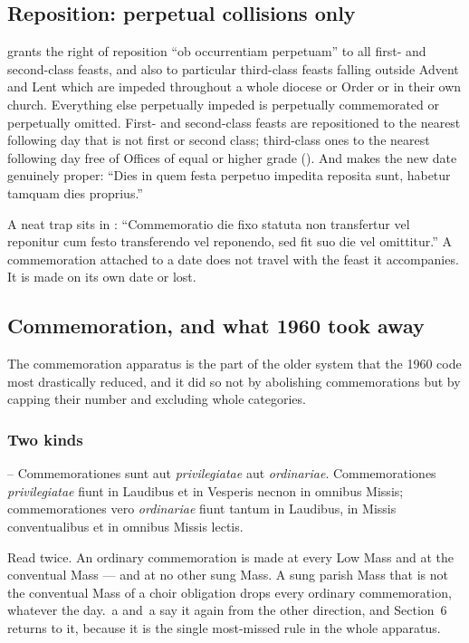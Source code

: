\subsection{Reposition: perpetual collisions only}

 grants the right of reposition ``ob occurrentiam perpetuam'' to all
first- and second-class feasts, and also to particular third-class feasts
falling outside Advent and Lent which are impeded throughout a whole diocese or
Order or in their own church. Everything else perpetually impeded is
perpetually commemorated or perpetually omitted. First- and second-class
feasts are repositioned to the nearest following day that is not first or
second class; third-class ones to the nearest following day free of Offices of
equal or higher grade (). And  makes the new date genuinely
proper: ``Dies in quem festa perpetuo impedita reposita sunt, habetur tamquam
dies proprius.''

A neat trap sits in : ``Commemoratio die fixo statuta non transfertur
vel reponitur cum festo transferendo vel reponendo, sed fit suo die vel
omittitur.'' A commemoration attached to a date does not travel with the feast
it accompanies. It is made on its own date or lost.

\subsection{Commemoration, and what 1960 took away}

The commemoration apparatus is the part of the older system that the 1960 code
most drastically reduced, and it did so not by abolishing commemorations but by
capping their number and excluding whole categories.

\subsubsection*{Two kinds}

\begin{rulebox}{--}
Commemorationes sunt aut \textit{privilegiatae} aut \textit{ordinariae}.
Commemorationes \textit{privilegiatae} fiunt in Laudibus et in Vesperis necnon
in omnibus Missis; commemorationes vero \textit{ordinariae} fiunt tantum in
Laudibus, in Missis conventualibus et in omnibus Missis lectis.
\end{rulebox}

\noindent
Read  twice. An ordinary commemoration is made at every Low Mass and
at the conventual Mass --- and at no other sung Mass. A sung parish Mass that
is not the conventual Mass of a choir obligation drops every ordinary
commemoration, whatever the day. \,a and \,a say it again
from the other direction, and Section~6 returns to it, because it is the single
most-missed rule in the whole apparatus.

